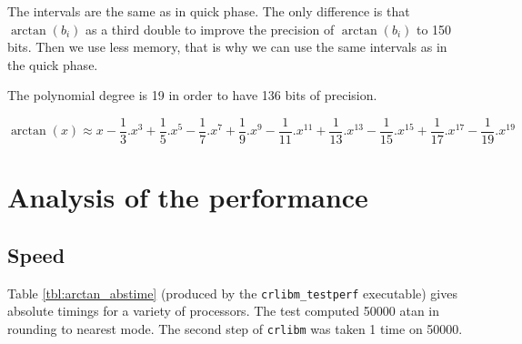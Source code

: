 The intervals are the same as in quick phase. The only difference is that
$\arctan(b_i)$ as a third double to improve the precision of $\arctan(b_i)$ to
150 bits. Then we use less memory, that is why we can use the same
intervals as in the quick phase.

The polynomial degree is 19 in order to have 136 bits of precision.

\begin{equation} \arctan(x) \approx
x-\frac{1}{3}.x^3+\frac{1}{5}.x^5-\frac{1}{7}.x^7+\frac{1}{9}.x^9-\frac{1}{11}.x^{11}+\frac{1}{13}.x^{13}-\frac{1}{15}.x^{15}+\frac{1}{17}.x^{17}-\frac{1}{19}.x^{19}
\label{eq:arctan_scspoly}
\end{equation}

\section{Analysis of the performance}

\subsection{Speed}
Table \ref{tbl:arctan_abstime} (produced by the \texttt{crlibm\_testperf}
executable) gives absolute timings for a variety of processors. The test
computed 50000 atan in rounding to nearest mode. The second step of
\texttt{crlibm} was taken 1 time on 50000.

